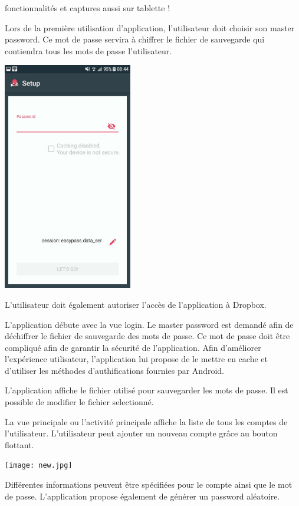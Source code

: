 
fonctionnalités et captures aussi sur tablette !

Lors de la première utilisation d'application, l'utilisateur doit choisir son master password. Ce mot de passe servira à chiffrer le fichier de sauvegarde qui contiendra tous les mots de passe l'utilisateur.

\includegraphics[height=10cm]{login.jpg}

L'utilisateur doit également autoriser l'accès de l'application à Dropbox.

L'application débute avec la vue login. Le master password est demandé afin de déchiffrer le fichier de sauvegarde des mots de passe. Ce mot de passe doit être compliqué afin de garantir la sécurité de l'application. Afin d'améliorer l'expérience utilisateur, l'application \easypass{} lui propose de le mettre en cache et d'utiliser les méthodes d'authifications fournies par Android.

L'application affiche le fichier utilisé pour sauvegarder les mots de passe. Il est possible de modifier le fichier selectionné.

La vue principale ou l'activité principale affiche la liste de tous les comptes de l'utilisateur. L'utilisateur peut ajouter un nouveau compte grâce au bouton flottant.

\texttt{[image: new.jpg]}

Différentes informations peuvent être spécifiées pour le compte ainsi que le mot de passe. L'application \easypass{} propose également de générer un password aléatoire.

